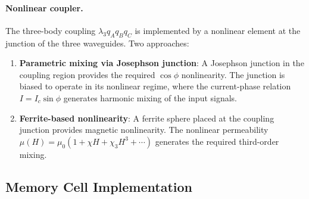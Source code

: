 \documentclass[12pt,a4paper,twoside]{article}
\begin{document}
\begin{center}
\end{center}

\paragraph{Nonlinear coupler.} The three-body coupling $\lambda_3 q_A q_B q_C$ is implemented by a nonlinear element at the junction of the three waveguides. Two approaches:

\begin{enumerate}
\item \textbf{Parametric mixing via Josephson junction}: A Josephson junction in the coupling region provides the required $\cos\phi$ nonlinearity. The junction is biased to operate in its nonlinear regime, where the current-phase relation $I = I_c \sin\phi$ generates harmonic mixing of the input signals.

\item \textbf{Ferrite-based nonlinearity}: A ferrite sphere placed at the coupling junction provides magnetic nonlinearity. The nonlinear permeability $\mu(H) = \mu_0(1 + \chi H + \chi_3 H^3 + \cdots)$ generates the required third-order mixing.
\end{enumerate}

\subsection{Memory Cell Implementation}\label{sec:mem_impl}
\end{document}
